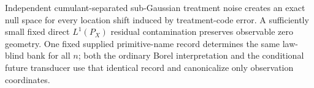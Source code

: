 Independent cumulant-separated sub-Gaussian treatment noise creates an exact null space for every location shift induced by treatment-code error. A sufficiently small fixed direct \(L^1(P_X)\) residual contamination preserves observable zero geometry. One fixed supplied primitive-name record determines the same law-blind bank for all \(n\); both the ordinary Borel interpretation and the conditional future transducer use that identical record and canonicalize only observation coordinates.